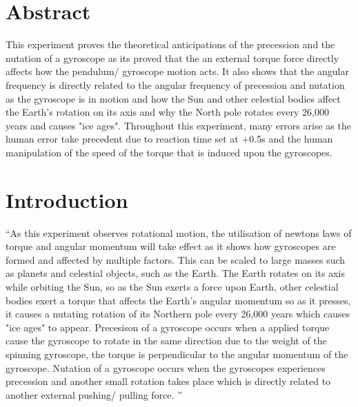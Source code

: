 \documentclass[12pt]{article}
\begin{document}
\newpage
\begin{titlepage}
\begin{tableofcontents}
\end{tableofcontents}
\end{titlepage}
\newpage
\section{Abstract}
\label{Abstract Section}

This experiment proves the theoretical anticipations of the precession and the nutation of a gyroscope as its proved that the an external torque force directly affects how the pendulum/ gyroscope motion acts. It also shows that the angular frequency is directly related to the angular frequency of precession and nutation as the gyroscope is in motion and how the Sun and other celestial bodies affect the Earth’s rotation on its axis and why the North pole rotates every 26,000 years and causes "ice ages". Throughout this experiment, many errors arise as the human error take precedent due to reaction time set at +0.5s and the human manipulation of the speed of the torque that is induced upon the gyroscopes.

\section{Introduction}
\label{Introduction Section}

“As this experiment observes rotational motion, the utilisation of newtons laws of torque and angular momentum will take effect as it shows how gyroscopes are formed and affected by multiple factors. This can be scaled to large masses such as planets and celestial objects, such as the Earth. The Earth rotates on its axis while orbiting the Sun, so as the Sun exerts a force upon Earth, other celestial bodies exert a torque that affects the Earth's angular momentum so as it presses, it causes a nutating rotation of its Northern pole every 26,000 years which causes "ice ages" to appear. Precesison of a gyroscope occurs when a applied torque cause the gyroscope to rotate in the same direction due to the weight of the spinning gyroscope, the torque is perpendicular to the angular momentum of the gyroscope. Nutation of a gyroscope occurs when the gyroscopes experiences precession and another small rotation takes place which is directly related to another external pushing/ pulling force.  ” \cite{Exp.4-2019} \\
\end{document}
